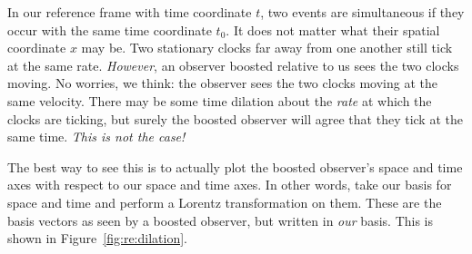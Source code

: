 In our reference frame with time coordinate $t$, two events are simultaneous if they occur with the same time coordinate $t_0$. It does not matter what their spatial coordinate $x$ may be. Two stationary clocks far away from one another still tick at the same rate. \emph{However}, an observer boosted relative to us sees the two clocks moving. No worries, we think: the observer sees the two clocks moving at the same velocity. There may be some time dilation about the \emph{rate} at which the clocks are ticking, but surely the boosted observer will agree that they tick at the same time. \emph{This is not the case!}


\begin{exercise}
The best way to see this is to actually plot the boosted observer's space and time axes with respect to our space and time axes. In other words, take our basis for space and time and perform a Lorentz transformation on them. These are the basis vectors as seen by a boosted observer, but written in \emph{our} basis. This is shown in Figure~\ref{fig:re:dilation}.
\end{exercise}

